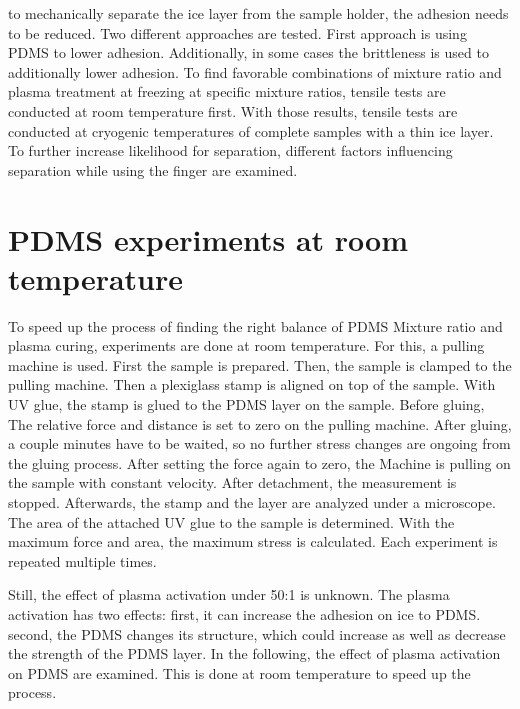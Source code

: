 
to mechanically separate the ice layer from the sample holder, the adhesion needs to be reduced. Two different approaches are tested. First approach is using PDMS to lower adhesion. Additionally, in some cases the brittleness is used to additionally lower adhesion. To find favorable combinations of mixture ratio and plasma treatment at freezing at specific mixture ratios, tensile tests are conducted at room temperature first. With those results, tensile tests are conducted at cryogenic temperatures of complete samples with a thin ice layer. To further increase likelihood for separation, different factors influencing separation while using the finger are examined.

\section{PDMS experiments at room temperature}

To speed up the process of finding the right balance of PDMS Mixture ratio and plasma curing, experiments are done at room temperature. For this, a pulling machine is used. First the sample is prepared. Then, the sample is clamped to the pulling machine. Then a plexiglass stamp is aligned on top of the sample. With UV glue, the stamp is glued to the PDMS layer on the sample. Before gluing, The relative force and distance is set to zero on the pulling machine. After gluing, a couple minutes have to be waited, so no further stress changes are ongoing from the gluing process. After setting the force again to zero, the Machine is pulling on the sample with constant velocity. After detachment, the measurement is stopped. Afterwards, the stamp and the layer are analyzed under a microscope. The area of the attached UV glue to the sample is determined. With the maximum force and area, the maximum stress is calculated. Each experiment is repeated multiple times.



Still, the effect of plasma activation under 50:1 is unknown. The plasma activation has two effects: first, it can increase the adhesion on ice to PDMS. second, the PDMS changes its structure, which could increase as well as decrease the strength of the PDMS layer. In the following, the effect of plasma activation on PDMS are examined. This is done at room temperature to speed up the process.

